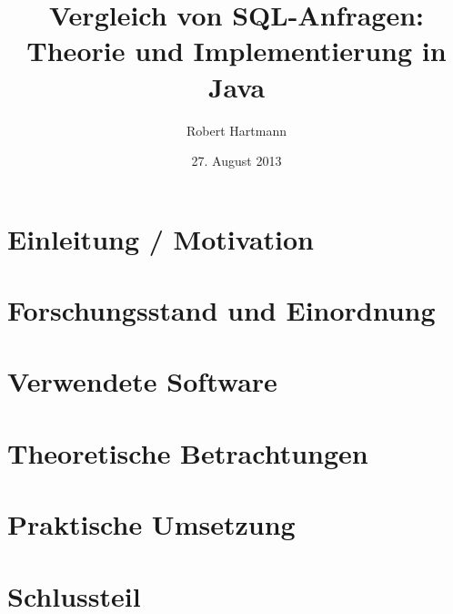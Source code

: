 \documentclass[12pt]{scrreprt}
\author{Robert Hartmann}
\title{Vergleich von SQL-Anfragen: Theorie und Implementierung in Java}
\date{27. August 2013}
\theoremstyle{remark}
\begin{document}

%

\pagestyle{plain}
\tableofcontents

\onehalfspacing

\chapter{Einleitung / Motivation}
\label{chap:introduction}


\chapter{Forschungsstand und Einordnung}
\label{chap:forschung}


\chapter{Verwendete Software}
\label{chap:software}


\chapter{Theoretische Betrachtungen}
\label{chap:theorie}



\chapter{Praktische Umsetzung}
\label{chap:praxis}


\chapter{Schlussteil}
\label{chap:ausblick}

\end{document}
